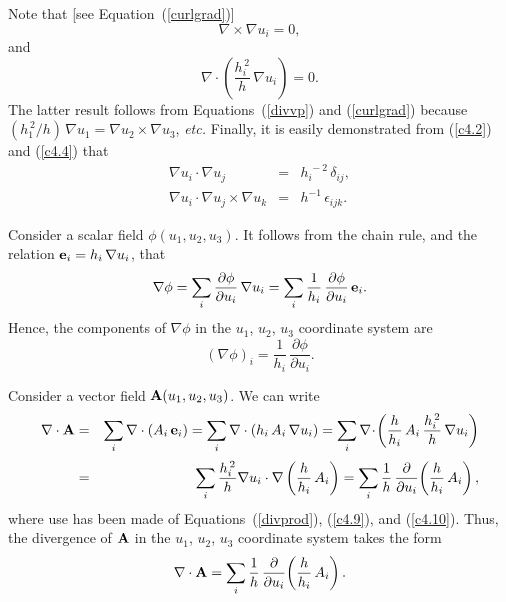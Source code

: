 Note that [see Equation~(\ref{curlgrad})]
\begin{equation}\label{c4.8}
\nabla\times \nabla u_i = 0,
\end{equation}
and 
\begin{equation}\label{c4.9}
\nabla\cdot \left(\frac{h_i^{\,2}}{h}\,\nabla u_i\right) = 0.
\end{equation}
The latter result follows from Equations~(\ref{divvp}) and (\ref{curlgrad}) because $(h_1^{\,2}/h)\,\nabla u_1= \nabla u_2\times \nabla u_3$, 
{\em etc.} Finally, it is easily demonstrated from (\ref{c4.2}) and (\ref{c4.4}) that
\begin{eqnarray}
\nabla u_i\cdot \nabla u_j &=&h_i^{\,-2}\,\delta_{ij},\label{c4.10}\\[0.5ex]
\nabla u_i\cdot\nabla u_j\times \nabla u_k&=& h^{-1}\,\epsilon_{ijk}.\label{c4.11}
\end{eqnarray}

Consider a scalar field $\phi(u_1,u_2,u_3)$. It follows from the chain rule, and the relation ${\bf e}_i = h_i\,\nabla u_i$,
that 
\begin{equation}\label{c4.12}
\nabla \phi = \sum_i \frac{\partial \phi}{\partial u_i}\,\nabla u_i=\sum_i\frac{1}{h_i}\,\frac{\partial \phi}{\partial u_i}\,{\bf e}_i.
\end{equation}
Hence, the components of $\nabla\phi$  in the $u_1$, $u_2$, $u_3$ coordinate system are 
\begin{equation}\label{c4.13}
(\nabla\phi)_i = \frac{1}{h_i}\,\frac{\partial \phi}{\partial u_i}.
\end{equation}

Consider a vector field ${\bf A}(u_1,u_2,u_3)$. We can write
\begin{eqnarray}
\nabla\cdot{\bf A} &=&\sum_i\nabla\cdot(A_i\,{\bf e}_i) =\sum_i\nabla\cdot (h_i\,A_i\,\nabla u_i)=
\sum_i\nabla\!\cdot\!\left(\frac{h}{h_i}\,A_i\,\frac{h_i^{\,2}}{h}\,\nabla u_i\right)\nonumber\\[0.5ex]
&=&\sum_i\frac{h_i^{\,2}}{h}\nabla u_i\cdot\nabla\left(\frac{h}{h_i}\,A_i\right)=\sum_i
\frac{1}{h}\,\frac{\partial}{\partial u_i}\!\left(\frac{h}{h_i}\,A_i\right),
\end{eqnarray}
where use has been made of Equations~(\ref{divprod}), (\ref{c4.9}), and (\ref{c4.10}). Thus, the
divergence of ${\bf A}$ in the $u_1$, $u_2$, $u_3$ coordinate system takes the form
\begin{equation}\label{c4.14}
\nabla\cdot{\bf A} =\sum_i
\frac{1}{h}\,\frac{\partial}{\partial u_i}\!\left(\frac{h}{h_i}\,A_i\right).
\end{equation}

